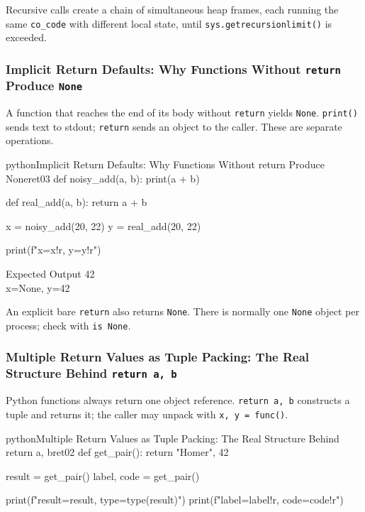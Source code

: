Recursive calls create a chain of simultaneous heap frames, each running the same \texttt{co\_code} with different local state, until \texttt{sys.getrecursionlimit()} is exceeded.

\subsubsection{Implicit Return Defaults: Why Functions Without \texttt{return} Produce \texttt{None}}

A function that reaches the end of its body without \texttt{return} yields \texttt{None}. \texttt{print()} sends text to stdout; \texttt{return} sends an object to the caller. These are separate operations.

\begin{codebox}[]{python}{Implicit Return Defaults: Why Functions Without return Produce None}{ret03}
def noisy_add(a, b):
    print(a + b)

def real_add(a, b):
    return a + b

x = noisy_add(20, 22)
y = real_add(20, 22)

print(f"x={x!r}, y={y!r}")
\end{codebox}


\begin{iobox}{Expected Output}
42 \\
x=None, y=42 \\
\end{iobox}




An explicit bare \texttt{return} also returns \texttt{None}. There is normally one \texttt{None} object per process; check with \texttt{is None}.

\subsubsection{Multiple Return Values as Tuple Packing: The Real Structure Behind \texttt{return a, b}}

Python functions always return one object reference. \texttt{return a, b} constructs a tuple and returns it; the caller may unpack with \texttt{x, y = func()}.

\begin{codebox}[]{python}{Multiple Return Values as Tuple Packing: The Real Structure Behind return a, b}{ret02}
def get_pair():
    return "Homer", 42

result = get_pair()
label, code = get_pair()

print(f"result={result}, type={type(result)}")
print(f"label={label!r}, code={code!r}")
\end{codebox}


